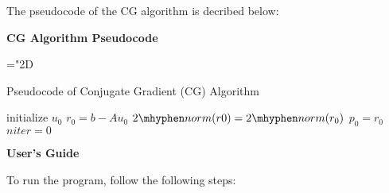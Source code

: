 \documentclass[12pt]{article} %
\begin{document}
The pseudocode of the CG algorithm is decribed below:
\bigskip

\textbf{\Large{CG Algorithm Pseudocode\\}}
\begin{algorithm}[H]
  \mathchardef\mhyphen="2D
  \caption{Pseudocode of Conjugate Gradient (CG) Algorithm}
  \SetAlgoLined
  initialize $u_{0}$\;
  $r_{0} = b - A u_{0}$\;
  $2\mhyphen norm(r0) = 2\mhyphen norm(r_{0})$\;
  $p_{0} = r_{0}$\;
  $niter = 0$\;

\end{algorithm}

\bigskip
\noindent
\textbf{\Large{User's Guide}}

\bigskip
To run the program, follow the following steps:
\end{document}
